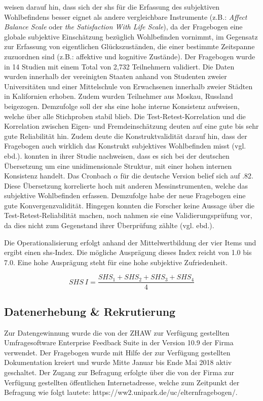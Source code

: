  weisen darauf hin, dass sich der \acrshort{shs} für die Erfassung des subjektiven Wohlbefindens besser eignet als andere vergleichbare Instrumente (z.B.: \textit{Affect Balance Scale} oder \textit{the Satisfaction With Life Scale}), da der Fragebogen eine globale subjektive Einschätzung bezüglich Wohlbefinden vornimmt, im Gegensatz zur Erfassung von eigentlichen Glückszuständen, die einer bestimmte Zeitspanne zuzuordnen sind (z.B.: affektive und kognitive Zustände). Der Fragebogen wurde in 14 Studien mit einem Total von 2,732 Teilnehmern validiert. Die Daten wurden innerhalb der vereinigten Staaten anhand von Studenten zweier Universitäten und einer Mittelschule von Erwachsenen innerhalb zweier Städten in Kalifornien erhoben. Zudem wurden Teilnehmer aus Moskau, Russland beigezogen. Demzufolge soll der \acrshort{shs} eine hohe interne Konsistenz aufweisen, welche über alle Stichproben stabil blieb. Die Test-Retest-Korrelation und die Korrelation zwischen Eigen- und Fremdeinschätzung deuten auf eine gute bis sehr gute Reliabilität hin.  
Zudem deute die Konstruktvalidität darauf hin, dass der Fragebogen auch wirklich das Konstrukt subjektives Wohlbefinden misst (vgl. ebd.).  konnten in ihrer Studie nachweisen, dass es sich bei der deutschen Übersetzung um eine unidimensionale Struktur, mit einer hohen internen Konsistenz handelt. Das Cronbach $\alpha$ für die deutsche Version belief sich auf .82. Diese Übersetzung korrelierte hoch mit anderen Messinstrumenten, welche das subjektive Wohlbefinden erfassen. Demzufolge habe der neue Fragebogen eine gute Konvergenzvalidität. Hingegen konnten die Forscher keine Aussage über die Test-Retest-Reliabilität machen, noch nahmen sie eine Validierungsprüfung vor, da dies nicht zum Gegenstand ihrer Überprüfung zählte (vgl. ebd.).

Die Operationalisierung erfolgt anhand der Mittelwertbildung der vier Items \cite{Lyubomirsky1999} und ergibt einen \acrshort{shs}-Index. Die mögliche Ausprägung dieses Index reicht von 1.0 bis 7.0. Eine hohe Ausprägung steht für eine hohe subjektive Zufriedenheit.

\begin{equation}\label{eq:SHS}
    SHS~I=\frac{SHS_{1}+SHS_{2}+SHS_{3}+SHS_{4}}{4}
\end{equation}

\subsection{Datenerhebung \& Rekrutierung}\label{sec:Datenerhebung}
Zur Datengewinnung wurde die von der ZHAW zur Verfügung gestellten Umfragesoftware Enterprise Feedback Suite in der Version 10.9 der Firma  verwendet. Der Fragebogen wurde mit Hilfe der zur Verfügung gestellten Dokumentation kreiert \cite{EFS2016} und wurde Mitte Januar bis Ende Mai 2018 aktiv geschaltet.  Der Zugang zur Befragung erfolgte über die von der Firma  zur Verfügung gestellten öffentlichen Internetadresse, welche zum Zeitpunkt der Befragung wie folgt lautete: https://ww2.unipark.de/uc/elternfragebogen/.

